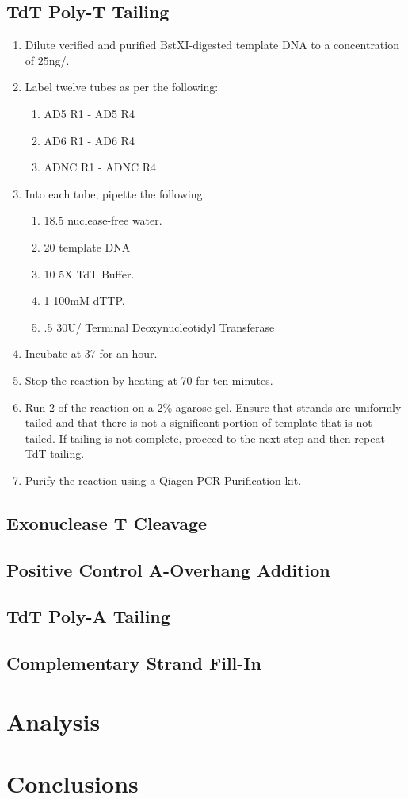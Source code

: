 \documentclass{ssiBio}
\begin{document}
\subsection{TdT Poly-T Tailing}
\begin{enumerate}
  \item{Dilute verified and purified BstXI-digested template DNA to a concentration of 25ng/\uL{}.}
  \item{Label twelve tubes as per the following:}
  \begin{enumerate}
    \item{AD5 R1 - AD5 R4}
    \item{AD6 R1 - AD6 R4}
    \item{ADNC R1 - ADNC R4}
  \end{enumerate}
  \item{Into each tube, pipette the following:}
  \begin{enumerate}
    \item{18.5\uL{} nuclease-free water.}
    \item{20\uL{} template DNA}
    \item{10\uL{} 5X TdT Buffer.}
    \item{1\uL{} 100mM dTTP.}
    \item{.5\uL{} 30U/\uL{} Terminal Deoxynucleotidyl Transferase}
  \end{enumerate}
  \item{Incubate at 37\C{} for an hour.}
  \item{Stop the reaction by heating at 70\C{} for ten minutes.}
  \stopPoint{}
  \item{Run 2\uL{} of the reaction on a 2\% agarose gel. Ensure that strands are uniformly tailed and that there is not a significant portion of template that is not tailed. If tailing is not complete, proceed to the next step and then repeat TdT tailing.}
  \item{Purify the reaction using a Qiagen PCR Purification kit.}
  \stopPoint{}
\end{enumerate}

\subsection{Exonuclease T Cleavage}

\subsection{Positive Control A-Overhang Addition}

\subsection{TdT Poly-A Tailing}

\subsection{Complementary Strand Fill-In}

\section{Analysis}

\section{Conclusions}



\end{document}
